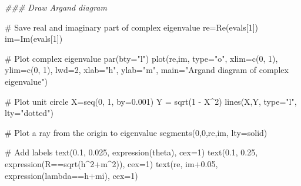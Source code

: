\documentclass[
  letterpaper,
  DIV=11,
  numbers=noendperiod]{scrreprt}
\newenvironment{Shaded}{\begin{snugshade}}{\end{snugshade}}
\newcommand{\AttributeTok}[1]{\textcolor[rgb]{0.40,0.45,0.13}{#1}}
\newcommand{\CommentTok}[1]{\textcolor[rgb]{0.37,0.37,0.37}{#1}}
\newcommand{\DecValTok}[1]{\textcolor[rgb]{0.68,0.00,0.00}{#1}}
\newcommand{\DocumentationTok}[1]{\textcolor[rgb]{0.37,0.37,0.37}{\textit{#1}}}
\newcommand{\FloatTok}[1]{\textcolor[rgb]{0.68,0.00,0.00}{#1}}
\newcommand{\FunctionTok}[1]{\textcolor[rgb]{0.28,0.35,0.67}{#1}}
\newcommand{\NormalTok}[1]{\textcolor[rgb]{0.00,0.23,0.31}{#1}}
\newcommand{\OtherTok}[1]{\textcolor[rgb]{0.00,0.23,0.31}{#1}}
\newcommand{\SpecialCharTok}[1]{\textcolor[rgb]{0.37,0.37,0.37}{#1}}
\newcommand{\StringTok}[1]{\textcolor[rgb]{0.13,0.47,0.30}{#1}}
\begin{document}
\begin{Shaded}
\begin{Highlighting}[]
\DocumentationTok{\#\#\# Draw Argand diagram}

\CommentTok{\# Save real and imaginary part of complex eigenvalue}
\NormalTok{re}\OtherTok{=}\FunctionTok{Re}\NormalTok{(evals[}\DecValTok{1}\NormalTok{])}
\NormalTok{im}\OtherTok{=}\FunctionTok{Im}\NormalTok{(evals[}\DecValTok{1}\NormalTok{])}

\CommentTok{\# Plot complex eigenvalue}
\FunctionTok{par}\NormalTok{(}\AttributeTok{bty=}\StringTok{"l"}\NormalTok{)}
\FunctionTok{plot}\NormalTok{(re,im, }\AttributeTok{type=}\StringTok{"o"}\NormalTok{, }\AttributeTok{xlim=}\FunctionTok{c}\NormalTok{(}\DecValTok{0}\NormalTok{, }\DecValTok{1}\NormalTok{), }\AttributeTok{ylim=}\FunctionTok{c}\NormalTok{(}\DecValTok{0}\NormalTok{, }\DecValTok{1}\NormalTok{), }\AttributeTok{lwd=}\DecValTok{2}\NormalTok{, }\AttributeTok{xlab=}\StringTok{"h"}\NormalTok{, }\AttributeTok{ylab=}\StringTok{"m"}\NormalTok{, }\AttributeTok{main=}\StringTok{"Argand diagram of complex eigenvalue"}\NormalTok{)}

\CommentTok{\# Plot unit circle}
\NormalTok{X}\OtherTok{=}\FunctionTok{seq}\NormalTok{(}\DecValTok{0}\NormalTok{, }\DecValTok{1}\NormalTok{, }\AttributeTok{by=}\FloatTok{0.001}\NormalTok{)}
\NormalTok{Y }\OtherTok{=} \FunctionTok{sqrt}\NormalTok{(}\DecValTok{1} \SpecialCharTok{{-}}\NormalTok{ X}\SpecialCharTok{\^{}}\DecValTok{2}\NormalTok{) }
\FunctionTok{lines}\NormalTok{(X,Y, }\AttributeTok{type=}\StringTok{"l"}\NormalTok{, }\AttributeTok{lty=}\StringTok{"dotted"}\NormalTok{)}

\CommentTok{\# Plot a ray from the origin to eigenvalue}
\FunctionTok{segments}\NormalTok{(}\DecValTok{0}\NormalTok{,}\DecValTok{0}\NormalTok{,re,im, }\AttributeTok{lty=}\StringTok{\textquotesingle{}solid\textquotesingle{}}\NormalTok{)}

\CommentTok{\# Add labels}
\FunctionTok{text}\NormalTok{(}\FloatTok{0.1}\NormalTok{, }\FloatTok{0.025}\NormalTok{, }\FunctionTok{expression}\NormalTok{(theta), }\AttributeTok{cex=}\DecValTok{1}\NormalTok{)}
\FunctionTok{text}\NormalTok{(}\FloatTok{0.1}\NormalTok{, }\FloatTok{0.25}\NormalTok{, }\FunctionTok{expression}\NormalTok{(R}\SpecialCharTok{==}\FunctionTok{sqrt}\NormalTok{(h}\SpecialCharTok{\^{}}\DecValTok{2}\SpecialCharTok{+}\NormalTok{m}\SpecialCharTok{\^{}}\DecValTok{2}\NormalTok{)), }\AttributeTok{cex=}\DecValTok{1}\NormalTok{)}
\FunctionTok{text}\NormalTok{(re, im}\FloatTok{+0.05}\NormalTok{, }\FunctionTok{expression}\NormalTok{(lambda}\SpecialCharTok{==}\NormalTok{h}\SpecialCharTok{+}\NormalTok{mi), }\AttributeTok{cex=}\DecValTok{1}\NormalTok{)}
\end{Highlighting}
\end{Shaded}
\end{document}
